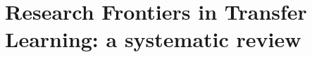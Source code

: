 


\chapter{Research Frontiers in Transfer Learning: a systematic review}\label{ch:frontiers}

\cleardoublepage 
